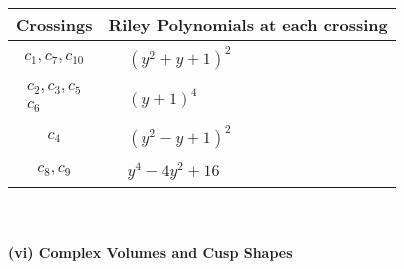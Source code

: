 \documentclass[1p]{elsarticle_modified}
\theoremstyle{definition}
\begin{document}
\begin{tabular}{m{50pt}|m{274pt}}
Crossings & \hspace{64pt}Riley Polynomials at each crossing \\
\hline $$\begin{aligned}c_{1},c_{7},c_{10}\end{aligned}$$&$\begin{aligned}
&(y^2+y+1)^2
\end{aligned}$\\
\hline $$\begin{aligned}c_{2},c_{3},c_{5}\\c_{6}\end{aligned}$$&$\begin{aligned}
&(y+1)^4
\end{aligned}$\\
\hline $$\begin{aligned}c_{4}\end{aligned}$$&$\begin{aligned}
&(y^2- y+1)^2
\end{aligned}$\\
\hline $$\begin{aligned}c_{8},c_{9}\end{aligned}$$&$\begin{aligned}
&y^4-4 y^2+16
\end{aligned}$\\
\hline
\end{tabular}\\~\\
\newpage\flushleft \textbf{(vi) Complex Volumes and Cusp Shapes}
\end{document}

